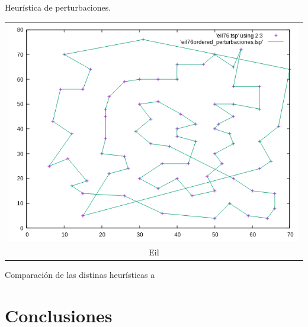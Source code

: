 \documentclass[10pt, xcolor=table]{beamer}
\begin{document}
\begin{frame}[fragile]{Heurística de perturbaciones. }
\begin{center}
\begin{tabular}{c}
\includegraphics[scale=0.23]{./Images/eil_perturbaciones.png} \\
Eil
\end{tabular}
\end{center}
\end{frame}

\begin{frame}[fragile]{Comparación de las distinas heurísticas}
a
\end{frame}

\section{Conclusiones}
\end{document}

